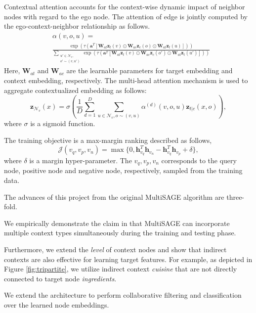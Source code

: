 Contextual attention accounts for the context-wise dynamic impact of neighbor nodes with regard to the ego node. The attention of edge is jointly computed by the ego-context-neighbor relationship as follows.
\begin{equation}
\begin{split}
    & \alpha(v, o, u) = \\
    & \frac{\exp\left(\tau(\mathbf{a}^T[\mathbf{W}_{at}\mathbf{z}_t(v) \odot \mathbf{W}_{ac}\mathbf{z}_c(o) \odot \mathbf{W}_{at}\mathbf{z}_t(u)])\right)}{\sum\limits_{\substack{u' \in \mathcal{N}_v,\\o' \sim (v, u')}}\exp\left(\tau(\mathbf{a}^T[\mathbf{W}_{at}\mathbf{z}_t(v) \odot \mathbf{W}_{ac}\mathbf{z}_c(o') \odot \mathbf{W}_{at}\mathbf{z}_t(u')])\right)}
\end{split}
\end{equation}
Here, $\mathbf{W}_{at}$ and $\mathbf{W}_{ac}$ are the learnable parameters for target embedding and context embedding, respectively. The multi-head attention mechanism is used to aggregate contextualized embedding as follows:
\begin{equation}
    \mathbf{z}_{\mathcal{N}_v}(x) = \sigma \left( \frac{1}{D} \sum_{d=1}^{D} \sum_{u \in \mathcal{N}_v, o \sim (v, u)} \alpha^{(d)}(v, o, u) \mathbf{z}_{t|c}(x, o) \right),
\end{equation}
where $\sigma$ is a sigmoid function.

The training objective is a max-margin ranking described as follows,
\begin{equation}
    \mathcal{J}(v_q, v_p, v_n) = \max\{ 0, \mathbf{h}_{v_q}^T \mathbf{h}_{v_n} - \mathbf{h}_{v_q}^T \mathbf{h}_{v_p} + \delta \},
\end{equation}
where $\delta$ is a margin hyper-parameter. The $v_q, v_p, v_n$ corresponds to the query node, positive node and negative node, respectively, sampled from the training data.

The advances of this project from the original MultiSAGE algorithm are three-fold.
\bit
    \item We empirically demonstrate the claim in \cite{yang2020multisage} that MultiSAGE can incorporate multiple context types simultaneously during the training and testing phase.
    \item Furthermore, we extend the \emph{level} of context nodes and show that indirect contexts are also effective for learning target features. For example, as depicted in Figure \ref{fig:tripartite}, we utilize indirect context \textit{cuisine} that are not directly connected to target node \textit{ingredients}.
    \item We extend the architecture to perform collaborative filtering and classification over the learned node embeddings.
\eit


